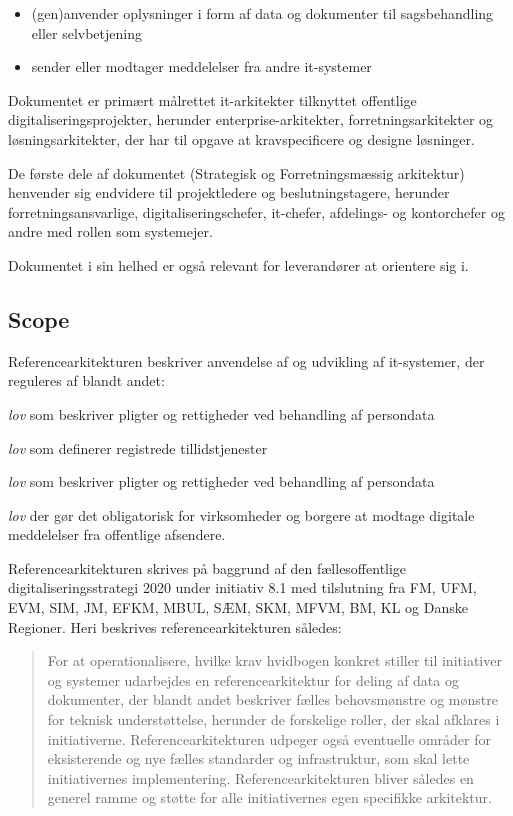 \begin{itemize}
\tightlist
\item
  (gen)anvender oplysninger i form af data og dokumenter til
  sagsbehandling eller selvbetjening
\item
  sender eller modtager meddelelser fra andre it-systemer
\end{itemize}

Dokumentet er primært målrettet it-arkitekter tilknyttet offentlige
digitaliseringsprojekter, herunder enterprise-arkitekter,
forretningsarkitekter og løsningsarkitekter, der har til opgave at
kravspecificere og designe løsninger.

De første dele af dokumentet (Strategisk og Forretningsmæssig
arkitektur) henvender sig endvidere til projektledere og
beslutningstagere, herunder forretningsansvarlige,
digitaliseringschefer, it-chefer, afdelings- og kontorchefer og andre
med rollen som systemejer.

Dokumentet i sin helhed er også relevant for leverandører at orientere
sig i.

\subsection{Scope}\label{scope}

Referencearkitekturen beskriver anvendelse af og udvikling af
it-systemer, der reguleres af blandt andet:

\begin{description}
\tightlist
\item[EU databeskyttelse]
\emph{lov} som beskriver pligter og rettigheder ved behandling af
persondata
\item[EU eIDAS]
\emph{lov} som definerer registrede tillidstjenester
\item[Persondatalov]
\emph{lov} som beskriver pligter og rettigheder ved behandling af
persondata
\item[Lov om Digital Post]
\emph{lov} der gør det obligatorisk for virksomheder og borgere at
modtage digitale meddelelser fra offentlige afsendere.
\end{description}

Referencearkitekturen skrives på baggrund af den fællesoffentlige
digitaliseringsstrategi 2020 under initiativ 8.1 med tilslutning fra FM,
UFM, EVM, SIM, JM, EFKM, MBUL, SÆM, SKM, MFVM, BM, KL og Danske
Regioner. Heri beskrives referencearkitekturen således:

\begin{quote}
For at operationalisere, hvilke krav hvidbogen konkret stiller til
initiativer og systemer udarbejdes en referencearkitektur for deling af
data og dokumenter, der blandt andet beskriver fælles behovsmønstre og
mønstre for teknisk understøttelse, herunder de forskelige roller, der
skal afklares i initiativerne. Referencearkitekturen udpeger også
eventuelle områder for eksisterende og nye fælles standarder og
infrastruktur, som skal lette initiativernes implementering.
Referencearkitekturen bliver således en generel ramme og støtte for alle
initiativernes egen specifikke arkitektur.
\end{quote}

